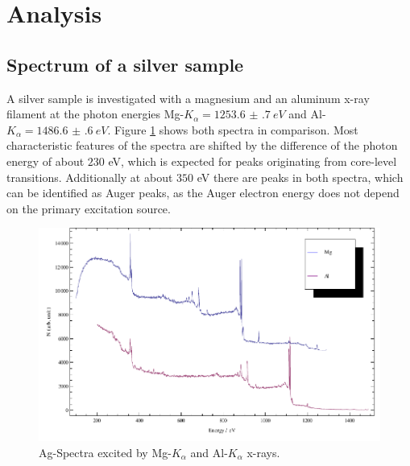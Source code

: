 \documentclass[a4paper]{scrartcl}
\numberwithin{equation}{section}
\numberwithin{figure}{section}
\numberwithin{table}{section}
\begin{document}
\clearpage
\section{Analysis}
\subsection{Spectrum of a silver sample}
A silver sample is investigated with a magnesium and an aluminum x-ray filament at the photon energies Mg-$K_\alpha=\SI{1253.6(7)}{eV}$ and Al-$K_\alpha=\SI{1486.6(6)}{eV}$. Figure \ref{fig:compare} shows both spectra in comparison. Most characteristic features of the spectra are shifted by the difference of the photon energy of about $230$ eV, which is expected for peaks originating from core-level transitions. Additionally at about $350$ eV there are peaks in both spectra, which can be identified as Auger peaks, as the Auger electron energy does not depend on the primary excitation source.

\begin{figure}
  \centering
   	\includegraphics[width=0.8\linewidth]{img/compare.pdf}
 \caption{\small Ag-Spectra excited by Mg-$K_\alpha$ and Al-$K_\alpha$ x-rays.  }
        \label{fig:compare}
\end{figure}
\end{document}
